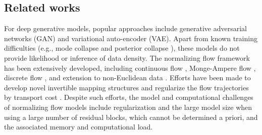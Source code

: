 \documentclass{article}
\theoremstyle{remark}
\theoremstyle{plain}
\newcommand{\revold}[1]{{\color{black}#1}}
\begin{document}
\subsection{Related works}\label{related_work}


%
For deep generative models, popular approaches include generative adversarial networks (GAN) \citep{GAN,WassersteinGAN,CGAN} and variational auto-encoder (VAE)\citep{VAE,VAE_review}. 
Apart from known training difficulties (e.g., mode collapse \citep{Salimans2016ImprovedTF} and posterior collapse \citep{Lucas2019UnderstandingPC}), these models do not provide likelihood or inference of data density. 
The normalizing flow framework \citep{nflow_review} has been extensively developed, including continuous flow \citep{FFJORD}, Monge-Ampere flow \citep{zhang2018monge}, discrete flow \citep{ResFlow}, 
\revold{and extension to non-Euclidean data \citep{liu2019graph,mathieu2020riemannian,xu2022invertible}.}
Efforts have been made to develop novel invertible mapping structures \citep{RNVP,papamakarios2017masked}
and regularize the flow trajectories \revold{by transport cost }  \citep{finlay2020train,OT-Flow,ruthotto2020machine,xu2022invertible,huang2023bridging}.
Despite such efforts, the model and computational challenges of normalizing flow models include regularization and the large model size when using a large number of residual blocks, which cannot be determined a priori, and the associated memory and computational load.
\end{document}
